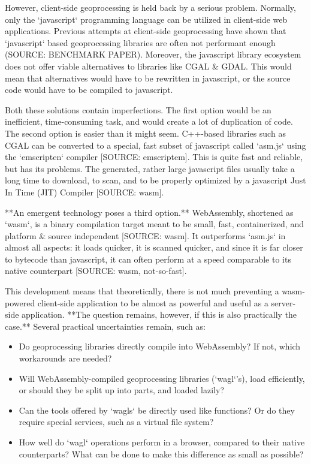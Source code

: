 However, client-side geoprocessing is held back by a serious problem.
Normally, only the `javascript` programming language can be utilized in client-side web applications. Previous attempts at client-side geoprocessing have shown that `javascript` based geoprocessing libraries are often not performant enough (SOURCE: BENCHMARK PAPER). 
Moreover, the javascript library ecosystem does not offer viable alternatives to libraries like CGAL \& GDAL. 
This would mean that alternatives would have to be rewritten in javascript, or the source code would have to be compiled to javascript. 


Both these solutions contain imperfections. The first option would be an inefficient, time-consuming task, and would create a lot of duplication of code. The second option is easier than it might seem. C++-based libraries such as CGAL can be converted to a special, fast subset of javascript called `asm.js` using the `emscripten` compiler [SOURCE: emscriptem]. This is quite fast and reliable, but has its problems. The generated, rather large javascript files usually take a long time to download, to scan, and to be properly optimized by a javascript Just In Time (JIT) Compiler [SOURCE: wasm]. 

**An emergent technology poses a third option.** WebAssembly, shortened as `wasm`, is a binary compilation target meant to be small, fast, containerized, and platform \& source independent [SOURCE: wasm]. It outperforms `asm.js` in almost all aspects: it loads quicker, it is scanned quicker, and since it is far closer to bytecode than javascript, it can often perform at a speed comparable to its native counterpart [SOURCE: wasm, not-so-fast]. 


This development means that theoretically, there is not much preventing a wasm-powered client-side application to be almost as powerful and useful as a server-side application. **The question remains, however, if this is also practically the case.** Several practical uncertainties remain, such as: 
\begin{itemize}
  \item Do geoprocessing libraries directly compile into WebAssembly? If not, which workarounds are needed? 
  \item Will WebAssembly-compiled geoprocessing libraries (`wagl`'s), load efficiently, or should they be split up into parts, and loaded lazily? 
  \item Can the tools offered by `wagls` be directly used like functions? Or do they require special services, such as a virtual file system? 
  \item How well do `wagl` operations perform in a browser, compared to their native counterparts? What can be done to make this difference as small as possible?
\end{itemize}

